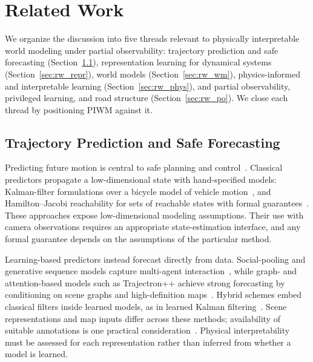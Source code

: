 \documentclass[preprint,12pt]{elsarticle}
\begin{document}
\section{Related Work}\label{sec:related}

We organize the discussion into five threads relevant to physically interpretable
world modeling under partial observability: trajectory prediction and safe forecasting
(Section~\ref{sec:rw_traj}), representation learning for dynamical systems
(Section~\ref{sec:rw_repr}), world models (Section~\ref{sec:rw_wm}),
physics-informed and interpretable learning (Section~\ref{sec:rw_phys}), and
partial observability, privileged learning, and road structure
(Section~\ref{sec:rw_po}).
We close each thread by positioning PIWM against it.

\subsection{Trajectory Prediction and Safe Forecasting}\label{sec:rw_traj}

Predicting future motion is central to safe planning and
control~\cite{fridovich2020confidence}.
Classical predictors propagate a low-dimensional state with hand-specified
models: Kalman-filter formulations over a bicycle model of vehicle
motion~\cite{ammoun2009real}, and Hamilton--Jacobi reachability for sets of
reachable states with formal guarantees~\cite{li2021prediction,
nakamura2023online, muthali2023multi}.
These approaches expose low-dimensional modeling assumptions. Their use with
camera observations requires an appropriate state-estimation interface, and
any formal guarantee depends on the assumptions of the particular method.

Learning-based predictors instead forecast directly from data.
Social-pooling and generative sequence models capture multi-agent
interaction~\cite{alahi2016social, gupta2018social, wen2022social}, while graph-
and attention-based models such as Trajectron++ achieve strong forecasting by
conditioning on scene graphs and high-definition maps~\cite{salzmann2020trajectron++}.
Hybrid schemes embed classical filters inside learned models, as in learned
Kalman filtering~\cite{revach2022kalmannet}.
Scene representations and map inputs differ across these methods; availability
of suitable annotations is one practical consideration~\cite{itkina2023interpretable,
hsu2023interpretable}. Physical interpretability must be assessed for each
representation rather than inferred from whether a model is learned.
\end{document}
